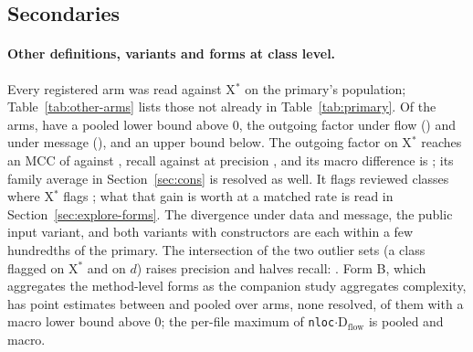 \documentclass[11pt,a4paper]{article}
\newcommand{\madz}{modified $z \geq 3.5$}
\newcommand{\fitwidth}[1]{\resizebox{\ifdim\width>\textwidth\textwidth\else\width\fi}{!}{#1}}
\newcommand{\sig}[1]{\texttt{#1}}
\newcommand{\Xs}{X$^*$}
\newcommand{\Dflow}{D$_{\text{flow}}$}
\begin{document}
\subsection{Secondaries}
\label{sec:secondary}

\paragraph{Other definitions, variants and forms at class level.}
Every registered arm was read against \Xs{} on the primary's population;
Table~\ref{tab:other-arms} lists those not already in
Table~\ref{tab:primary}. Of the \secOtherArms{} arms, \secOtherLoAbove{}
have a pooled lower bound above 0, the outgoing factor under flow
(\secOFlowMicro{}) and under message (\secOMessageMicro{}), and
\secOtherHiBelow{} an upper bound below. The outgoing factor on \Xs{}
reaches an MCC of \secOFlowMcc{} against \primXMcc{}, recall
\secOFlowRecall{} against \primXRecall{} at precision \secOFlowPrecision{},
and its macro difference is \secOFlowMacro{}; its family average in
Section~\ref{sec:cons} is resolved as well. It flags \matchedOOwnFlags{}
reviewed classes where \Xs{} flags \matchedXOwnFlags{}; what that gain is
worth at a matched rate is read in Section~\ref{sec:explore-forms}. The divergence under data and
message, the public input variant, and both variants with constructors are
each within a few hundredths of the primary. The intersection of the two
outlier sets (a class flagged on \Xs{} and on $d$) raises precision and
halves recall: \secAndMicro{}. Form B, which aggregates the method-level
forms as the companion study aggregates complexity, has point estimates
between \secFormBMinMicro{} and \secFormBMaxMicro{} pooled over
\secFormBArms{} arms, none resolved, \secFormBMacroLoAbove{} of them with a
macro lower bound above 0; the per-file maximum of
\sig{nloc}$\cdot$\Dflow{} is \secDFormBMicro{} pooled and
\secDFormBMacro{} macro.

\begin{table}[t]
\centering
\caption{Every registered class-level arm against \Xs{} on the primary's
population, by \madz{}: the other two coupling definitions, the outgoing
factor, the factors alone, the intersection of the two outlier sets, the
public input variant, both variants with constructors, and class form B
(the per-file maximum of the method-level form). Secondaries: no
multiplicity correction, none can change the primary.}
\label{tab:other-arms}
\footnotesize
\setlength{\tabcolsep}{3pt}
\fitwidth{}
\end{table}
\end{document}
